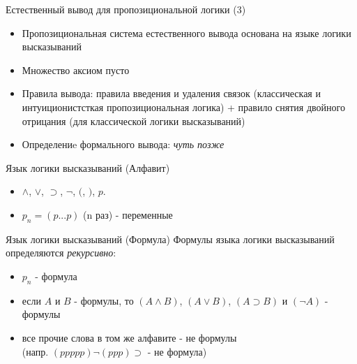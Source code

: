 \documentclass{beamer}
\begin{document}
\begin{frame}{Естественный вывод для пропозициональной логики (3)}
\begin{itemize}
  \item Пропозициональная система естественного вывода основана на языке логики высказываний
  \item Множество аксиом пусто
  \item Правила вывода: правила введения и удаления связок (классическая и интуиционистсткая пропозициональная логика) + правило снятия двойного отрицания (для классической логики высказываний)
  \item Определениe формального вывода: \textit{чуть позже}
\end{itemize}
\end{frame}

\begin{frame}{Язык логики высказываний (Алфавит)}
\begin{itemize}
  \item $\land$, $\lor$, $\supset$, $\neg$, $($, $)$, $p$.
  \item $p_n = (p...p)$ (n раз) - переменные
\end{itemize}
\end{frame}

\begin{frame}{Язык логики высказываний (Формула)}
Формулы языка логики высказываний определяются \textit{рекурсивно}:
\begin{itemize}
  \item $p_n$ - формула
  \item если $A$ и $B$ - формулы, то $(A \land B)$, $(A \lor B)$, $(A \supset B)$ и $(\neg A)$ - формулы
  \item все прочие слова в том же алфавите - не формулы\\ (напр. $(ppppp) \neg (ppp) \supset$ - не формула)
\end{itemize}
\end{frame}
\end{document}
